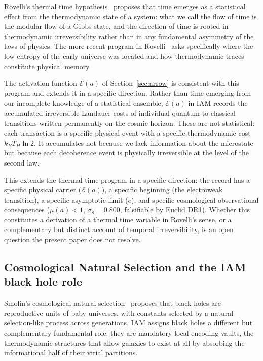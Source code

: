 \documentclass[12pt,a4paper]{article}
\begin{document}
Rovelli's thermal time hypothesis~\citep{Connes1994,Rovelli1993} proposes
that time emerges as a statistical effect from the thermodynamic state of
a system: what we call the flow of time is the modular flow of a
Gibbs state, and the direction of time is rooted in thermodynamic
irreversibility rather than in any fundamental asymmetry of the laws of
physics. The more recent program in Rovelli~\citep{Rovelli2019,Rovelli2020}
asks specifically where the low entropy of the early universe was located
and how thermodynamic traces constitute physical memory.

The activation function $\mathcal{E}(a)$ of Section~\ref{sec:arrow}
is consistent with this program and extends it in a specific direction.
Rather than time emerging from our incomplete knowledge of a statistical
ensemble, $\mathcal{E}(a)$ in IAM records the accumulated irreversible
Landauer costs of individual quantum-to-classical transitions written
permanently on the cosmic horizon. These are not statistical: each
transaction is a specific physical event with a specific thermodynamic
cost $k_B T_H \ln 2$. It accumulates not because we lack information
about the microstate but because each decoherence event is physically
irreversible at the level of the second law.

This extends the thermal time program in a specific direction: the record
has a specific physical carrier ($\mathcal{E}(a)$), a specific beginning
(the electroweak transition), a specific asymptotic limit ($e$), and
specific cosmological observational consequences ($\mu(a) < 1$,
$\sigma_8 = 0.800$, falsifiable by Euclid DR1). Whether this constitutes a derivation of a thermal time
variable in Rovelli's sense, or a complementary but distinct account of
temporal irreversibility, is an open question the present paper does not
resolve.

\subsection{Cosmological Natural Selection and the IAM black hole role}

Smolin's cosmological natural selection~\citep{Smolin1992,Smolin1997}
proposes that black holes are reproductive units of baby universes,
with constants selected by a natural-selection-like process across
generations. IAM assigns black holes a different but complementary
fundamental role: they are mandatory local encoding vaults, the
thermodynamic structures that allow galaxies to exist at all by absorbing
the informational half of their virial partitions.
\end{document}
